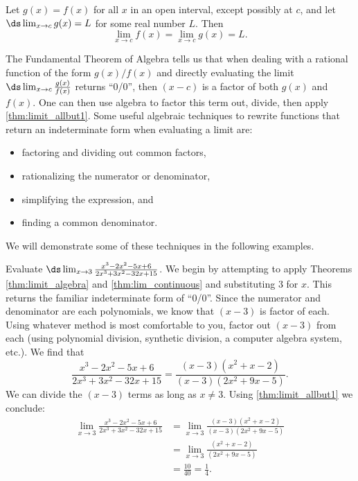\begin{theorem}\label{thm:limit_allbut1}
Let $g(x) = f(x)$ for all $x$ in an open interval, except possibly at $c$, and let $\ds \lim_{x\to c} g(x) = L$ for some real number $L$. Then
\[\lim_{x\to c} f(x)=\lim_{x\to c} g(x)=L.\]
\end{theorem}

The Fundamental Theorem of Algebra tells us that when dealing with a rational function of the form $g(x)/f(x)$ and directly evaluating the limit $\ds \lim_{x\to c} \frac{g(x)}{f(x)}$ returns ``0/0'', 
then $(x-c)$ is a factor of both $g(x)$ and $f(x)$. One can then use algebra to factor this term out, divide, then apply \autoref{thm:limit_allbut1}. Some useful algebraic techniques to rewrite functions that return an indeterminate form when evaluating a limit are:
\begin{itemize}
\item factoring and dividing out common factors,
\item rationalizing the numerator or denominator,
\item simplifying the expression, and
\item finding a common denominator.
\end{itemize}
We will demonstrate some of these techniques in the following examples.

\begin{example}\label{ex_limit_allbut1}
Evaluate $\ds \lim_{x\to 3} \frac{x^3-2 x^2-5 x+6}{2 x^3+3 x^2-32 x+15}$.
\solution
We begin by attempting to apply Theorems \ref{thm:limit_algebra} and \ref{thm:lim_continuous} and substituting 3 for $x$. This returns the familiar indeterminate form of ``0/0''. %
Since the numerator and denominator are each polynomials, we know that $(x-3)$ is factor of each. Using whatever method is most comfortable to you, factor out $(x-3)$ from each (using polynomial division, synthetic division, a computer algebra system, etc.). We find that
\[
\frac{x^3-2 x^2-5 x+6}{2 x^3+3 x^2-32 x+15}
= \frac{(x-3)(x^2+x-2)}{(x-3)(2 x^2+9 x-5)}.
\]
We can divide the $(x-3)$ terms as long as $x\neq 3$. Using \autoref{thm:limit_allbut1} we conclude:
	\begin{align*}
	\lim_{x\to 3} \frac{x^3-2 x^2-5 x+6}{2 x^3+3 x^2-32 x+15}
	&= \lim_{x\to 3}\frac{(x-3)(x^2+x-2)}{(x-3)(2 x^2+9 x-5)} \\
	&= \lim_{x\to 3} \frac{(x^2+x-2)}{(2 x^2+9 x-5)}\\
	&= \frac{10}{40} = \frac14.
	\end{align*}
\end{example}

